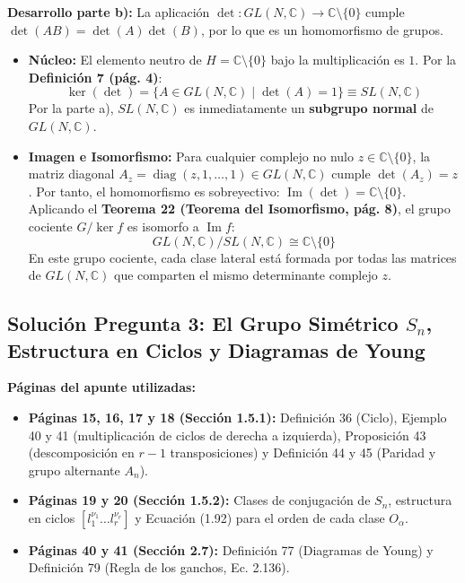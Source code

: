 \documentclass[11pt, a4paper]{article}
\begin{document}
\noindent \textbf{Desarrollo parte b):}
La aplicación $\det : GL(N, \mathbb{C}) \to \mathbb{C} \setminus \{0\}$ cumple $\det(AB) = \det(A)\det(B)$, por lo que es un homomorfismo de grupos.
\begin{itemize}
    \item \textbf{Núcleo:} El elemento neutro de $H = \mathbb{C} \setminus \{0\}$ bajo la multiplicación es $1$. Por la \textbf{Definición 7 (pág. 4)}:
    \[
    \ker(\det) = \{ A \in GL(N, \mathbb{C}) \mid \det(A) = 1 \} \equiv SL(N, \mathbb{C})
    \]
    Por la parte a), $SL(N, \mathbb{C})$ es inmediatamente un \textbf{subgrupo normal} de $GL(N, \mathbb{C})$.
    \item \textbf{Imagen e Isomorfismo:} Para cualquier complejo no nulo $z \in \mathbb{C} \setminus \{0\}$, la matriz diagonal $A_z = \operatorname{diag}(z, 1, \dots, 1) \in GL(N, \mathbb{C})$ cumple $\det(A_z) = z$. Por tanto, el homomorfismo es sobreyectivo: $\operatorname{Im}(\det) = \mathbb{C} \setminus \{0\}$. Aplicando el \textbf{Teorema 22 (Teorema del Isomorfismo, pág. 8)}, el grupo cociente $G / \ker f$ es isomorfo a $\operatorname{Im} f$:
    \[
    GL(N, \mathbb{C}) / SL(N, \mathbb{C}) \cong \mathbb{C} \setminus \{0\}
    \]
    En este grupo cociente, cada clase lateral está formada por todas las matrices de $GL(N, \mathbb{C})$ que comparten el mismo determinante complejo $z$.
\end{itemize}

\newpage

\subsection*{\textcolor{primary}{Solución Pregunta 3: El Grupo Simétrico $S_n$, Estructura en Ciclos y Diagramas de Young}}
\textbf{Páginas del apunte utilizadas:}
\begin{itemize}
    \item \textbf{Páginas 15, 16, 17 y 18 (Sección 1.5.1):} Definición 36 (Ciclo), Ejemplo 40 y 41 (multiplicación de ciclos de derecha a izquierda), Proposición 43 (descomposición en $r-1$ transposiciones) y Definición 44 y 45 (Paridad y grupo alternante $A_n$).
    \item \textbf{Páginas 19 y 20 (Sección 1.5.2):} Clases de conjugación de $S_n$, estructura en ciclos $[l_1^{\nu_1} \dots l_r^{\nu_r}]$ y Ecuación (1.92) para el orden de cada clase $O_\alpha$.
    \item \textbf{Páginas 40 y 41 (Sección 2.7):} Definición 77 (Diagramas de Young) y Definición 79 (Regla de los ganchos, Ec. 2.136).
\end{itemize}
\end{document}
